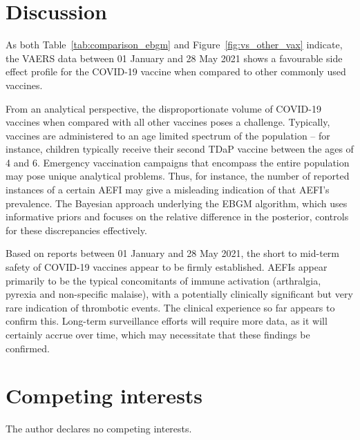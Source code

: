 \documentclass[12pt]{article}
\begin{document}


\section{Discussion} %
\label{sec:discussion}

As both Table~\ref{tab:comparison_ebgm} and Figure~\ref{fig:vs_other_vax} indicate, the VAERS data between 01 January and 28 May 2021 shows a favourable side effect profile for the COVID-19 vaccine when compared to other commonly used vaccines.  

From an analytical perspective, the disproportionate volume of COVID-19 vaccines when compared with all other vaccines poses a challenge. Typically, vaccines are administered to an age limited spectrum of the population – for instance, children typically receive their second TDaP vaccine between the ages of 4 and 6. Emergency vaccination campaigns that encompass the entire population may pose unique analytical problems. Thus, for instance, the number of reported instances of a certain AEFI may give a misleading indication of that AEFI's prevalence. The Bayesian approach underlying the EBGM algorithm, which uses informative priors and focuses on the relative difference in the posterior, controls for these discrepancies effectively.

Based on reports between 01 January and 28 May 2021, the short to mid-term safety of COVID-19 vaccines appear to be firmly established. AEFIs appear primarily to be the typical concomitants of immune activation (arthralgia, pyrexia and non-specific malaise), with a potentially clinically significant but very rare indication of thrombotic events. The clinical experience so far appears to confirm this.\cite{shimabukuro2021covid,welsh2021thrombocytopenia} Long-term surveillance efforts will require more data, as it will certainly accrue over time, which may necessitate that these findings be confirmed.


\section*{Competing interests} %
\label{sec:competing_interests}

The author declares no competing interests.



\end{document}
